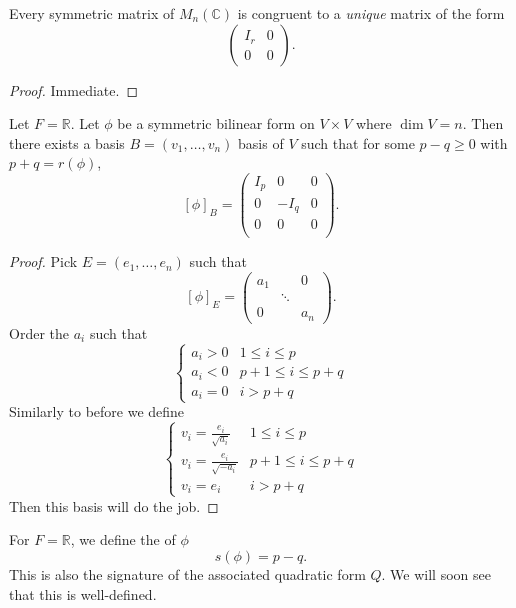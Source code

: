 \documentclass[a4paper]{scrartcl}
\begin{document}
\begin{corollary}
    Every symmetric matrix of $M_n (\mathbb{C})$ is congruent to a \emph{unique} matrix of the form 
    \[\left(
     \begin{array}{c|c}
      I_r &0\\
      \hline
      0&0
      \end{array}
      \right).\]
\end{corollary}
\begin{proof}
     Immediate.
\end{proof}
\begin{corollary}
    Let $F=\mathbb{R}$. Let $\phi$ be a symmetric bilinear form on $V \times V$ where $\operatorname{dim}V=n$. Then there exists a basis $B=(v_1, \ldots ,v_n)$ basis of $V$ such that for some $p-q \geq 0$ with $p+q=r (\phi)$,
    \[[\phi]_B=\left(
     \begin{array}{c|c|c}
      I_p &0&0\\
      \hline
      0 &-I_q&0\\
      \hline
      0 &0&0\\
      \end{array}
      \right).\]
\end{corollary}
\begin{proof}
    Pick $E=(e_1, \ldots , e_n)$ such that 
    \[[\phi]_E=
    \begin{pmatrix}
     a_1&&0\\ &\ddots&\\ 0&&a_n
     \end{pmatrix}.\]
    Order the $a_i$ such that 
    \begin{equation*}
         \begin{cases}
             a_i > 0 & 1 \leq i \leq p\\
             a_i<0 & p+1 \leq i \leq p+q\\
             a_i=0 & i > p+q
         \end{cases}
    \end{equation*}
    Similarly to before we define
    \begin{equation*}
        \begin{cases}
            v_i=\frac{e_i}{\sqrt{a_i}} & 1 \leq i \leq p\\
            v_i=\frac{e_i}{\sqrt{-a_i}} & p+1 \leq i \leq p+q\\
            v_i=e_i& i > p+q
        \end{cases}
    \end{equation*}
    Then this basis will do the job.
\end{proof}
\begin{definition}
     For $F=\mathbb{R}$, we define the  of $\phi$
     \[s(\phi)=p-q.\]
     This is also the signature of the associated quadratic form $Q$. We will soon see that this is well-defined.
\end{definition}
\end{document}
